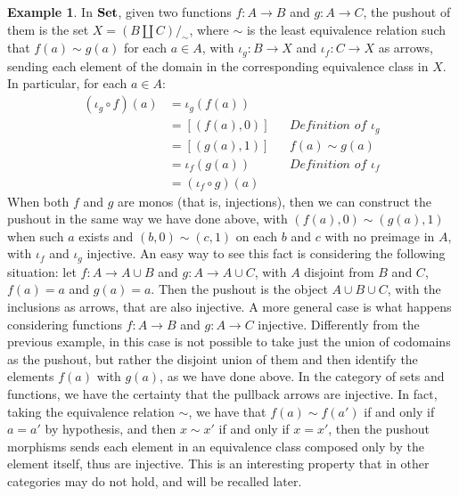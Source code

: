 \documentclass[a4paper, twoside,openright]{report}
\theoremstyle{plain}
\theoremstyle{definition}
\newtheorem{example}[theorem]{Example}
\begin{document}
\begin{example}\label{ex:po_in_set}
    \color{blue}
    In $\mathbf{Set}$, given two functions $f: A \rightarrow B$ and $g: A \rightarrow C$, the pushout of them is the set $X = (B \coprod C) /_\sim$, where $\sim$ is the least equivalence relation such that $f(a) \sim g(a)$ for each $a \in A$, with $\iota_g:B \rightarrow X$ and $\iota_f : C \rightarrow X$ as arrows, sending each element of the domain in the corresponding equivalence class in $X$. In particular, for each $a \in A$:
    \begin{align*}
        (\iota_g \circ f) (a)
                        &= \iota_g(f(a))    &&\\
                        &= [(f(a), 0)]           && \textit{Definition of $\iota_g$} \\
                        &= [(g(a), 1)]           && f(a) \sim g(a) \\
                        &= \iota_f(g(a))    && \textit{Definition of $\iota_f$} \\
                        &= (\iota_f \circ g) (a) &&
    \end{align*}
    When both $f$ and $g$ are monos (that is, injections), then we can construct the pushout in the same way we have done above, with $(f(a), 0) \sim (g(a), 1)$ when such $a$ exists and $(b, 0) \sim (c, 1)$ on each $b$ and $c$ with no preimage in $A$, with $\iota_f$ and $\iota_g$ injective.
    An easy way to see this fact is considering the following situation: let $f: A \rightarrow A \cup B$ and $g: A \rightarrow A \cup C$, with $A$ disjoint from $B$ and $C$, $f(a)= a$ and $g(a) = a$. Then the pushout is the object $A \cup B \cup C$, with the inclusions as arrows, that are also injective.
    A more general case is what happens considering functions $f: A \rightarrow B$ and $g: A \rightarrow C$ injective. Differently from the previous example, in this case is not possible to take just the union of codomains as the pushout, but rather the disjoint union of them and then identify the elements $f(a)$ with $g(a)$, as we have done above. In the category of sets and functions, we have the certainty that the pullback arrows are injective. In fact, taking the equivalence relation $\sim$, we have that $f(a) \sim f(a')$ if and only if $a = a'$ by hypothesis, and then $x \sim x'$ if and only if $x = x'$, then the pushout morphisms sends each element in an equivalence class composed only by the element itself, thus are injective.
    This is an interesting property that in other categories may do not hold, and will be recalled later.
\end{example}
\end{document}
